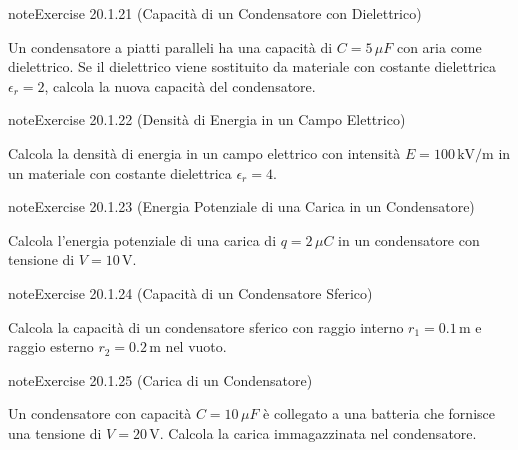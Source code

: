 \documentclass[letterpaper,10pt,italian]{jupyterBook}
\begin{document}
\begin{sphinxadmonition}{note}{Exercise 20.1.21 (Capacità di un Condensatore con Dielettrico)}



\sphinxAtStartPar
Un condensatore a piatti paralleli ha una capacità di \(C = 5 \, \mu F\) con aria come dielettrico. Se il dielettrico viene sostituito da materiale con costante dielettrica \(\epsilon_r = 2\), calcola la nuova capacità del condensatore.
\end{sphinxadmonition}
 \label{exercise:ch/electromagnetism/electrostatics-problems-exercise-21}

\begin{sphinxadmonition}{note}{Exercise 20.1.22 (Densità di Energia in un Campo Elettrico)}



\sphinxAtStartPar
Calcola la densità di energia in un campo elettrico con intensità \(E = 100 \, \text{kV/m}\) in un materiale con costante dielettrica \(\epsilon_r = 4\).
\end{sphinxadmonition}
 \label{exercise:ch/electromagnetism/electrostatics-problems-exercise-22}

\begin{sphinxadmonition}{note}{Exercise 20.1.23 (Energia Potenziale di una Carica in un Condensatore)}



\sphinxAtStartPar
Calcola l’energia potenziale di una carica di \(q = 2 \, \mu C\) in un condensatore con tensione di \(V = 10 \, \text{V}\).
\end{sphinxadmonition}
 \label{exercise:ch/electromagnetism/electrostatics-problems-exercise-23}

\begin{sphinxadmonition}{note}{Exercise 20.1.24 (Capacità di un Condensatore Sferico)}



\sphinxAtStartPar
Calcola la capacità di un condensatore sferico con raggio interno \(r_1 = 0.1 \, \text{m}\) e raggio esterno \(r_2 = 0.2 \, \text{m}\) nel vuoto.
\end{sphinxadmonition}
 \label{exercise:ch/electromagnetism/electrostatics-problems-exercise-24}

\begin{sphinxadmonition}{note}{Exercise 20.1.25 (Carica di un Condensatore)}



\sphinxAtStartPar
Un condensatore con capacità \(C = 10 \, \mu F\) è collegato a una batteria che fornisce una tensione di \(V = 20 \, \text{V}\). Calcola la carica immagazzinata nel condensatore.
\end{sphinxadmonition}
 \label{exercise:ch/electromagnetism/electrostatics-problems-exercise-25}
\end{document}
